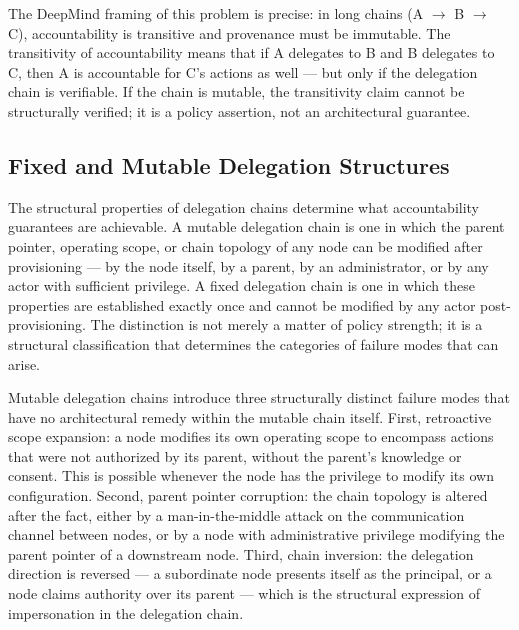 The DeepMind framing of this problem is precise: in long chains (A $\rightarrow$ B $\rightarrow$ C), accountability is transitive and provenance must be immutable.\cite{deepmind_accountability_twitter} The transitivity of accountability means that if A delegates to B and B delegates to C, then A is accountable for C's actions as well — but only if the delegation chain is verifiable. If the chain is mutable, the transitivity claim cannot be structurally verified; it is a policy assertion, not an architectural guarantee.

\subsection{Fixed and Mutable Delegation Structures}
\label{sec:rs-delegation}

The structural properties of delegation chains determine what accountability guarantees are achievable. A mutable delegation chain is one in which the parent pointer, operating scope, or chain topology of any node can be modified after provisioning — by the node itself, by a parent, by an administrator, or by any actor with sufficient privilege. A fixed delegation chain is one in which these properties are established exactly once and cannot be modified by any actor post-provisioning. The distinction is not merely a matter of policy strength; it is a structural classification that determines the categories of failure modes that can arise.\cite{bx3_recursive_spawning_integration}

Mutable delegation chains introduce three structurally distinct failure modes that have no architectural remedy within the mutable chain itself. First, retroactive scope expansion: a node modifies its own operating scope to encompass actions that were not authorized by its parent, without the parent's knowledge or consent. This is possible whenever the node has the privilege to modify its own configuration. Second, parent pointer corruption: the chain topology is altered after the fact, either by a man-in-the-middle attack on the communication channel between nodes, or by a node with administrative privilege modifying the parent pointer of a downstream node. Third, chain inversion: the delegation direction is reversed — a subordinate node presents itself as the principal, or a node claims authority over its parent — which is the structural expression of impersonation in the delegation chain.\cite{agent_delegation_vs_impersonation}

